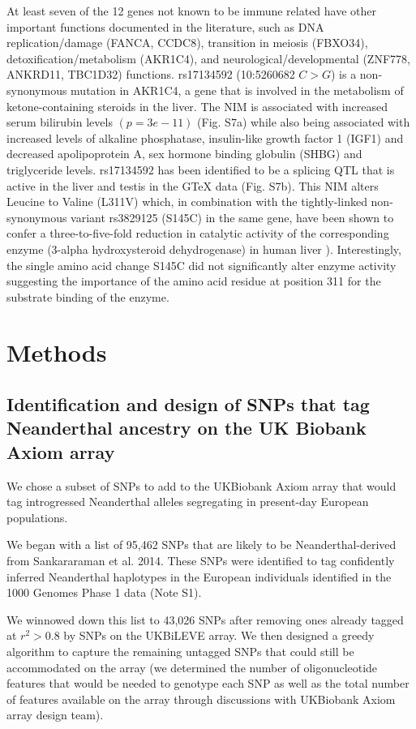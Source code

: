 At least seven of the 12 genes not known to be immune related have other important functions documented in the literature, such as DNA replication/damage (FANCA, CCDC8), transition in meiosis (FBXO34), detoxification/metabolism (AKR1C4), and neurological/developmental (ZNF778, ANKRD11, TBC1D32) functions. rs17134592 (10:5260682 $C>G$) is a non-synonymous mutation in AKR1C4, a gene that is involved in the metabolism of ketone-containing steroids in the liver. The NIM is associated with increased serum bilirubin levels $(p = 3e-11)$  (Fig. S7a) while also being associated with increased levels of alkaline phosphatase, insulin-like growth factor 1 (IGF1) and decreased apolipoprotein A, sex hormone binding globulin (SHBG) and triglyceride levels.  rs17134592 has been identified to be a splicing QTL that is active in the liver and testis in the GTeX data (Fig. S7b). This NIM alters Leucine to Valine (L311V) which, in combination with the tightly-linked non-synonymous variant rs3829125 (S145C) in the same gene, have been shown to confer a three-to-five-fold reduction in catalytic activity of the corresponding enzyme (3-alpha hydroxysteroid dehydrogenase) in human liver \cite{kume1999characterization}). Interestingly, the single amino acid change S145C did not significantly alter enzyme activity suggesting the importance of the amino acid residue at position 311 for the substrate binding of the enzyme.
\section{Methods}
\subsection{Identification and design of SNPs that tag Neanderthal ancestry on the UK Biobank Axiom array} \label{3.3.1}
We chose a subset of SNPs to add to the UKBiobank Axiom array that would tag introgressed Neanderthal alleles segregating in present-day European populations.
 
We began with a list of 95,462 SNPs that are likely to be Neanderthal-derived from Sankararaman et al. 2014. These SNPs were identified to tag confidently inferred Neanderthal haplotypes in the European individuals identified in the 1000 Genomes Phase 1 data (Note S1).

We winnowed down this list to 43,026 SNPs after removing ones already tagged at $r^2>0.8$ by SNPs on the UKBiLEVE array. We then designed a greedy algorithm to capture the remaining untagged SNPs that could still be accommodated on the array (we determined the number of oligonucleotide features that would be needed to genotype each SNP as well as the total number of features available on the array through discussions with UKBiobank Axiom array design team).

